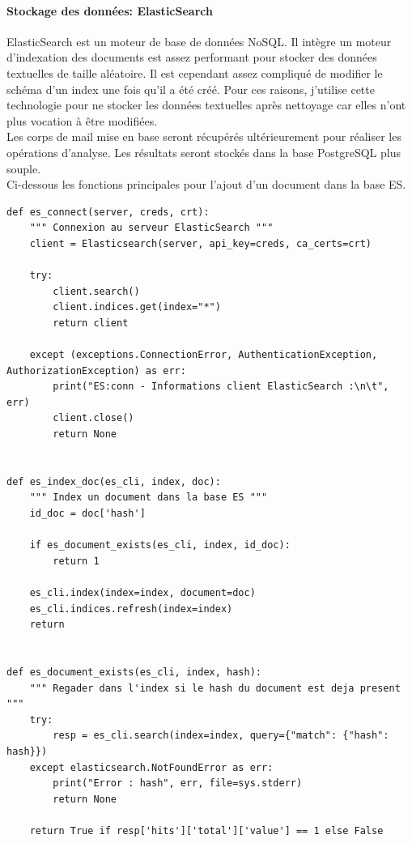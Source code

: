 \documentclass[a4paper,12pt]{article}
\begin{document}
			\paragraph{Stockage des données: ElasticSearch}
				ElasticSearch est un moteur de base de données NoSQL. Il intègre un moteur d'indexation des documents est assez performant pour stocker des données textuelles de taille aléatoire. 
				Il est cependant assez compliqué de modifier le schéma d'un index une fois qu'il a été créé. Pour ces raisons, j'utilise cette technologie pour ne stocker les données textuelles après nettoyage car elles n'ont plus vocation à être modifiées. \\
				
				Les corps de mail mise en base seront récupérés ultérieurement pour réaliser les opérations d'analyse. Les résultats seront stockés dans la base PostgreSQL plus souple. \\
				
				Ci-dessous les fonctions principales pour l'ajout d'un document dans la base ES.
				\begin{lstlisting}[title=Fonctions basique pour la liaison ElasticSearch]
def es_connect(server, creds, crt):
    """ Connexion au serveur ElasticSearch """
    client = Elasticsearch(server, api_key=creds, ca_certs=crt)

    try:
        client.search()
        client.indices.get(index="*")
        return client

    except (exceptions.ConnectionError, AuthenticationException, AuthorizationException) as err:
        print("ES:conn - Informations client ElasticSearch :\n\t", err)
        client.close()
        return None
        

def es_index_doc(es_cli, index, doc):
    """ Index un document dans la base ES """
    id_doc = doc['hash']

    if es_document_exists(es_cli, index, id_doc):
        return 1

    es_cli.index(index=index, document=doc)
    es_cli.indices.refresh(index=index)
    return 


def es_document_exists(es_cli, index, hash):
    """ Regader dans l'index si le hash du document est deja present """
    try:
        resp = es_cli.search(index=index, query={"match": {"hash": hash}})
    except elasticsearch.NotFoundError as err:
        print("Error : hash", err, file=sys.stderr)
        return None

    return True if resp['hits']['total']['value'] == 1 else False
				\end{lstlisting}
				
\end{document}
